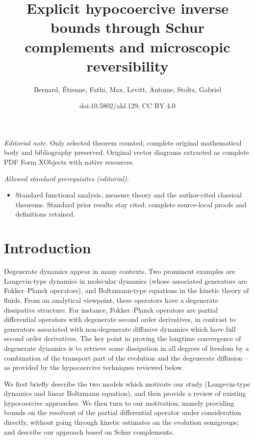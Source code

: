 \documentclass[10pt]{amsart}
\title{Explicit hypocoercive inverse bounds through Schur complements and microscopic reversibility}
\author{Bernard, Étienne, Fathi, Max, Levitt, Antoine, Stoltz, Gabriel}
\date{doi:10.5802/ahl.129; CC BY 4.0}
\theoremstyle{definition}\newtheorem{defi}[theo]{Definition}\newtheorem{rema}[theo]{Remark}\newtheorem{exam}[theo]{Example}\newtheorem{exem}[theo]{Example}\newtheorem{nota}[theo]{Notation}
\begin{document}
\maketitle
\noindent\textit{Editorial note.} Only selected theorem counted; complete original mathematical body and bibliography preserved. Original vector diagrams extracted as complete PDF Form XObjects with native resources.\par\medskip
\noindent\textit{Allowed standard prerequisites (editorial).}\begin{itemize}
\item Standard functional analysis, measure theory and the author-cited classical theorems. Standard prior results stay cited; complete source-local proofs and definitions retained.
\end{itemize}\medskip

\section{Introduction}

Degenerate dynamics appear in many contexts. Two prominent examples are Langevin-type dynamics in molecular dynamics (whose associated generators are Fokker--Planck operators), and Boltzmann-type equations in the kinetic theory of fluids. From an analytical viewpoint, these operators have a degenerate dissipative structure. For instance, Fokker--Planck operators are partial differential operators with degenerate second order derivatives, in contrast to generators associated with non-degenerate diffusive dynamics which have full second order derivatives. The key point in proving the longtime convergence of degenerate dynamics is to retrieve some dissipation in all degrees of freedom by a combination of the transport part of the evolution and the degenerate diffusion -- as provided by the hypocoercive techniques reviewed below.

We first briefly describe the two models which motivate our study (Langevin-type dynamics and linear Boltzmann equation), and then provide a review of existing hypocoercive approaches. We then turn to our motivation, namely providing bounds on the resolvent of the partial differential operator under consideration directly, without going through kinetic estimates on the evolution semigroups; and describe our approach based on Schur complements.
\end{document}
